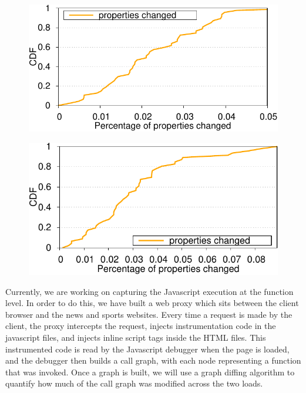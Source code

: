 \begin{figure}[t]
\centering
\includegraphics[width=0.9\columnwidth]{figs/cdf_bigdata_hr_new.pdf}
\label{fig:properties-hrs}
\end{figure}

\begin{figure}[t]
\centering
\includegraphics[width=0.9\columnwidth]{figs/cdf_bigdata_day_new.pdf}
\label{fig:properties-day}
\end{figure}


Currently, we are working on capturing the Javascript execution at the function level. 
In order to do this, we have built
a web proxy which sits between the client browser and the news and sports websites. Every time 
a request is made by the client, the proxy intercepts the request, injects instrumentation
code in the javascript files, and injects inline script tags inside the HTML files. 
This instrumented code is read by the Javascript debugger when the page is loaded, and 
the debugger then builds a call graph, with each node representing a function that was invoked. 
Once a graph is built, we will use a graph diffing algorithm to quantify
how much of the call graph was modified across the two loads. 

